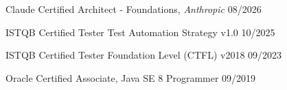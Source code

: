Claude Certified Architect - Foundations, \textit{Anthropic} \hfill 08/2026

ISTQB Certified Tester Test Automation Strategy v1.0 \hfill 10/2025

ISTQB Certified Tester Foundation Level (CTFL) v2018 \hfill 09/2023

Oracle Certified Associate, Java SE 8 Programmer \hfill 09/2019
